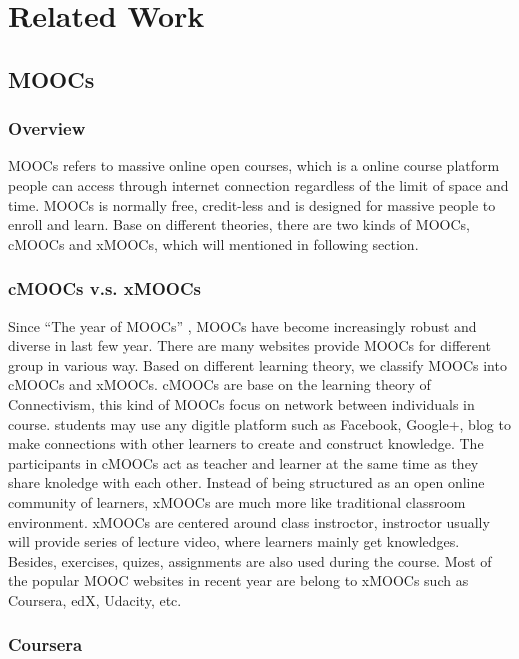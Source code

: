 \chapter{Related Work}\label{cha:Related}

\section{MOOCs}

\subsection{Overview}
MOOCs refers to massive online open courses, which is a online course platform people can access through internet connection regardless of the limit of space and time.
MOOCs is normally free, credit-less and is designed for massive people to enroll and learn.
Base on different theories, there are two kinds of MOOCs, cMOOCs and xMOOCs, which will mentioned in following section.

\subsection{cMOOCs v.s. xMOOCs}
Since ``The year of MOOCs'' \cite{pappano2012}, MOOCs have become increasingly robust and diverse in last few year.
There are many websites provide MOOCs for different group in various way.
Based on different learning theory, we classify MOOCs into cMOOCs and xMOOCs.
cMOOCs are base on the learning theory of Connectivism, this kind of MOOCs focus on network between individuals in course.
students may use any digitle platform such as Facebook, Google+, blog to make connections with other learners to create and construct knowledge.
The participants in cMOOCs act as teacher and learner at the same time as they share knoledge with each other.
Instead of being structured as an open online community of learners, xMOOCs are much more like traditional classroom environment.
xMOOCs are centered around class instroctor, instroctor usually will provide series of lecture video, where learners mainly get knowledges.
Besides, exercises, quizes, assignments are also used during the course.
Most of the popular MOOC websites in recent year are belong to xMOOCs such as Coursera, edX, Udacity, etc.

\subsection{Coursera}

